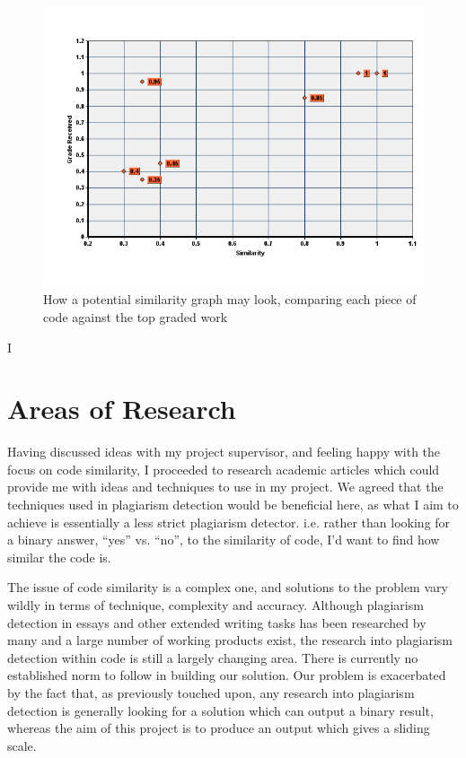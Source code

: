 \begin{figure}[h!]
	\centering
		\includegraphics[width=\textwidth]{Figures/similarityVsGradeGraph}
	\caption{How a potential similarity graph may look, comparing each piece of
	code against the top graded work}
	\label{fig:SimilarityVsGradeGraph}
\end{figure}

I





\section{Areas of Research}

Having discussed ideas with my project supervisor, and feeling happy with the
focus on code similarity, I proceeded to research academic articles which could
provide me with ideas and techniques to use in my project. We agreed that the
techniques used in plagiarism detection would be beneficial here, as what I aim
to achieve is essentially a less strict plagiarism detector. i.e. rather than
looking for a binary answer, ``yes'' vs. ``no'', to the similarity of code, I'd
want to find how similar the code is.

The issue of code similarity is a complex one, and solutions to the problem
vary wildly in terms of technique, complexity and accuracy. Although plagiarism
detection in essays and other extended writing tasks has been 
researched by many and a large number of working products exist, the research
into plagiarism detection within code is still a largely changing area. There
is currently no established norm to follow in building our solution. Our problem
is exacerbated by the fact that, as previously touched upon,
any research into plagiarism detection is
generally looking for a solution which can output a binary result, whereas the
aim of this project is to produce an output which gives a sliding scale.

